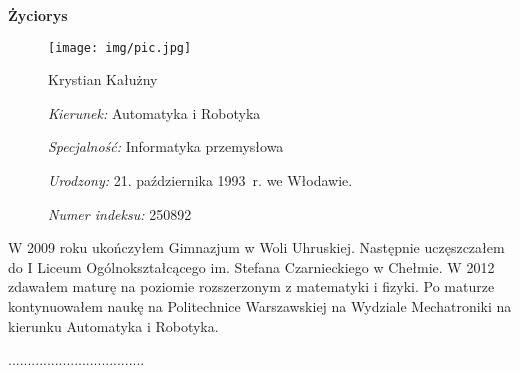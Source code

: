 \thispagestyle{empty}

\vspace*{2cm}

\begin{center}
	\textbf{Życiorys}
\end{center}
\begin{figure}[ht] %
	\begin{minipage}[b]{0.35\textwidth} %
		\centering
		\texttt{[image: img/pic.jpg]}
	\end{minipage}
	\hspace{0.5cm}
	\begin{minipage}[b]{0.6\textwidth}
		\begin{flushleft}
		Krystian Kałużny
		
		{\it Kierunek:} Automatyka i Robotyka
		
		{\it Specjalność: } Informatyka przemysłowa
		
		{\it Urodzony:} 21. października 1993~r. we Włodawie.
		
		{\it Numer indeksu:} 250892
		
		\end{flushleft}
	\end{minipage}
\end{figure}

W 2009 roku ukończyłem Gimnazjum w Woli Uhruskiej.
Następnie uczęszczałem do I Liceum Ogólnokształcącego im. Stefana Czarnieckiego w Chełmie.
W 2012 zdawałem maturę na poziomie rozszerzonym z matematyki i fizyki. 
Po maturze kontynuowałem naukę na Politechnice Warszawskiej na Wydziale Mechatroniki na kierunku Automatyka i Robotyka. 


\vspace{2cm}

\begin{flushright}
	\noindent...................................
\end{flushright}